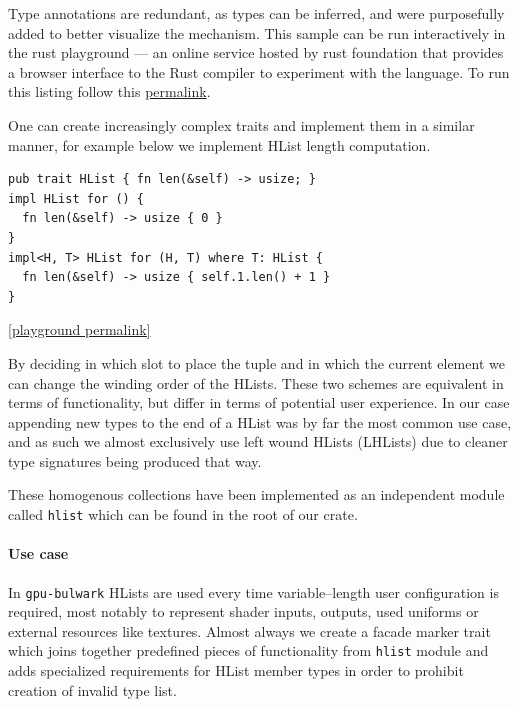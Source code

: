 Type annotations are redundant, as types can be inferred, and were purposefully added to better visualize the mechanism.
This sample can be run interactively in the rust playground --- an online service hosted by rust foundation that provides 
a browser interface to the Rust compiler to experiment with the language. 
To run this listing follow this \href{https://play.rust-lang.org/?version=stable&mode=debug&edition=2021&gist=0c13e950bb10a01dbae1981b0c15aa5f}{permalink}.

One can create increasingly complex traits and implement them in a similar manner, for example below we implement HList length computation.

\begin{lstlisting}
pub trait HList { fn len(&self) -> usize; }
impl HList for () {
  fn len(&self) -> usize { 0 }
}
impl<H, T> HList for (H, T) where T: HList {
  fn len(&self) -> usize { self.1.len() + 1 }
}
\end{lstlisting}

\noindent \href{https://play.rust-lang.org/?version=stable&mode=debug&edition=2021&gist=13d2d29f768d207f8fe7fa1bde7acef1}{[playground permalink]}

By deciding in which slot to place the tuple and in which the current element we can change the winding order of the HLists.
These two schemes are equivalent in terms of functionality, but differ in terms of potential user experience.
In our case appending new types to the end of a HList was by far the most common use case, and as such we almost exclusively use left wound HLists (LHLists)
due to cleaner type signatures being produced that way.

These homogenous collections have been implemented as an independent module called \texttt{hlist} which can be found in the root of our crate.

\paragraph{Use case}

In \texttt{gpu-bulwark} HLists are used every time variable--length user configuration is required, most notably to represent shader inputs, outputs, used uniforms or external resources like textures.
Almost always we create a facade marker trait which joins together predefined pieces of functionality from \texttt{hlist} module
and adds specialized requirements for HList member types in order to prohibit creation of invalid type list.

